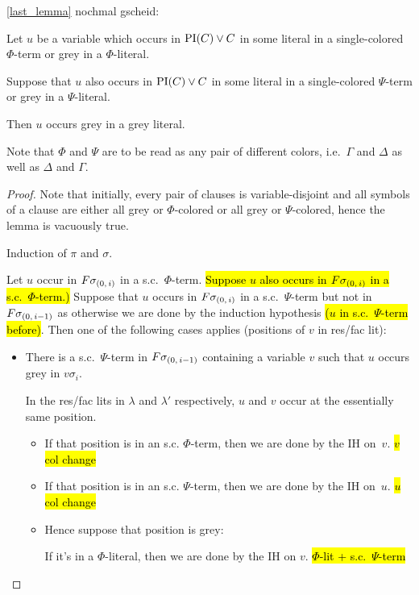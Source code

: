 \documentclass[,%
	draft=false,%
	numbers=noendperiod
	12pt,
	a4paper,
	oneside,%
	openany,
]{memoir}
\begin{document}
\clearpage
\begin{clemma}
	\ref{last_lemma} nochmal gscheid:

	Let $u$ be a variable which occurs in $\operatorname{PI}(C)\lor C$ in some literal in a single-colored $\Phi$-term or grey in a $\Phi$-literal.

	Suppose that $u$ also occurs in $\operatorname{PI}(C) \lor C$ in some literal in a single-colored $\Psi$-term or grey in a $\Psi$-literal.

	Then $u$ occurs grey in a grey literal.

\end{clemma}
Note that $\Phi$ and $\Psi$ are to be read as any pair of different colors, i.e.\ $\Gamma$ and $\Delta$ as well as $\Delta$ and $\Gamma$.
\begin{proof}
	Note that initially, every pair of clauses is variable-disjoint and all symbols of a clause are either all grey or $\Phi$-colored or all grey or $\Psi$-colored, hence the lemma is vacuously true.

	Induction of $\pi$ and $\sigma$.

	Let $u$ occur in $F\sigma_{(0,\,i)}$ in a s.c.\ $\Phi$-term.
	\hl{Suppose $u$ also occurs in $F\sigma_{(0,\,i)}$ in a s.c.\ $\Phi$-term.)}
	Suppose that $u$ occurs in $F\sigma_{(0,\,i)}$ in a s.c.\ $\Psi$-term but not in $F\sigma_{(0,\,i-1)}$ as otherwise we are done by the induction hypothesis \hl{($u$ in s.c.\ $\Psi$-term before)}.
	Then one of the following cases applies (positions of $v$ in res/fac lit):
	\begin{itemize}
		\item There is a s.c.\ $\Psi$-term in $F\sigma_{(0,\,i-1)}$ containing a variable $v$ such that $u$ occurs grey in $v\sigma_i$.

			In the res/fac lits in $\lambda$ and $\lambda'$ respectively, $u$ and $v$ occur at the essentially same position.

			\begin{itemize}
				\item
					If that position is in an s.c. $\Phi$-term, then we are done by the IH on~$v$.
					\hl{$v$ col change}

				\item
					If that position is in an s.c. $\Psi$-term, then we are done by the IH on~$u$.
					\hl{$u$ col change} 

				\item
					Hence suppose that position is grey:

					If it's in a $\Phi$-literal, then we are done by the IH on $v$. \hl{$\Phi$-lit + s.c.\ $\Psi$-term}


\end{itemize}
\end{itemize}
\end{proof}
\end{document}
